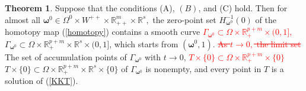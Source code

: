 \documentclass[11pt,pdflatex,sn-mathphys-ay]{sn-jnl}%
\theoremstyle{definition}
\theoremstyle{thmstyleone}%
\newtheorem{theorem}{Theorem}%
\theoremstyle{thmstyletwo}%
\theoremstyle{thmstylethree}%
\newcommand{\del}[1]{\textcolor{red}{\sout{#1}}}
\newcommand{\add}[1]{\textcolor{revisionblue}{#1}}
\begin{document}
	
	\vspace{0.3cm}
	\begin{theorem}\label{conver} Suppose that the conditions (A),
		$(B)$, and (C) hold. Then for almost all $\bm{\omega}^0\in
		\Omega^0\times  W^{++} \times \mathbb{R}^{m}_{++}\times
		\mathbb{R}^s,$ the zero-point set $H_{\bm{\omega}^0}^{-1}(0)$ of the
		homotopy map (\ref{homotopy}) contains a smooth curve
		\del{$\Gamma_{\bm{\omega}^0}\subset \Omega \times
			\mathbb{R}^{p+m}_{+}\times (0,1],$} 
		\add{$\Gamma_{\bm{\omega}^0}\subset \Omega \times
			\mathbb{R}^{p+m}_{+}\times\mathbb{R}^s\times (0,1]$,} which starts from $(\bm{\omega}^0,1).$
		\del{As $t\rightarrow 0,$ the limit set}
		\add{The set of accumulation points of
			$\Gamma_{\bm{\omega}^0}$ with $t\rightarrow0$,}
		\del{$T\times \{0\}\subset
			\Omega \times \mathbb{R}^{p+m}_{+}\times \{0\}$} 
		\add{$T\times \{0\}\subset
			\Omega \times \mathbb{R}^{p+m}_{+}
			\times\mathbb{R}^s\times \{0\}$} of
		$\Gamma_{\bm{\omega}^0}$ is nonempty, and every point in $T$ is a
		solution of (\ref{KKT}).
	\end{theorem}
	\vspace{-0.5cm}
\end{document}
